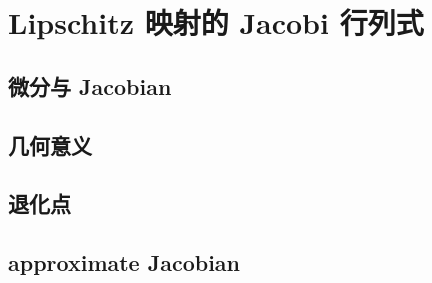 \section{Lipschitz 映射的 Jacobi 行列式}
\label{b1:sec:1702}


\subsection{微分与 Jacobian}
\label{b1:subsec:170201}

\subsection{几何意义}
\label{b1:subsec:170202}

\subsection{退化点}
\label{b1:subsec:170203}

\subsection{approximate Jacobian}
\label{b1:subsec:170204}


